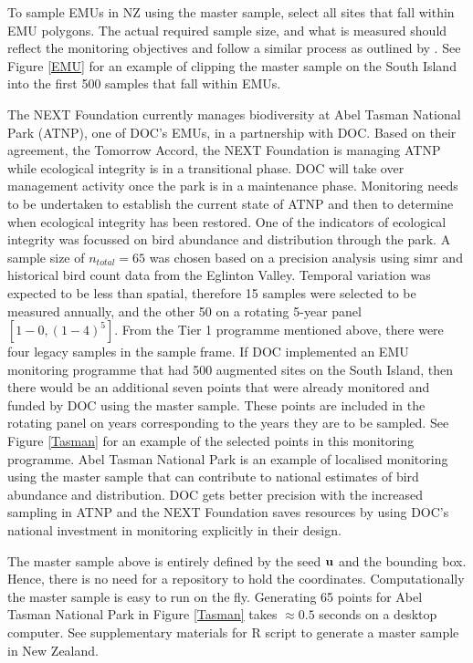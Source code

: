 \documentclass[titlepage]{article}
\begin{document}
To sample EMUs in NZ using the master sample, select all sites that fall within EMU polygons. The actual required sample size, and what is measured should reflect the monitoring objectives and follow a similar process as outlined by \citep{Reynolds2016}. See Figure \ref{EMU} for an example of clipping the master sample on the South Island into the first 500 samples that fall within EMUs.
 
The NEXT Foundation currently manages biodiversity at Abel Tasman National Park (ATNP), one of DOC's EMUs, in a partnership with DOC. Based on their agreement, the Tomorrow Accord, the NEXT Foundation is managing ATNP while ecological integrity is in a transitional phase. DOC will take over management activity once the park is in a maintenance phase. Monitoring needs to be undertaken to establish the current state of ATNP and then to determine when ecological integrity has been restored. One of the indicators of ecological integrity was focussed on bird abundance and distribution through the park. A sample size of $n_{total} = 65$ was chosen based on a precision analysis using simr \citep{simr} and historical bird count data from the Eglinton Valley. Temporal variation was expected to be less than spatial, therefore 15 samples were selected to be measured annually, and the other 50 on a rotating 5-year panel $[1-0,(1-4)^5]$. From the Tier 1 programme mentioned above, there were four legacy samples in the sample frame. If DOC implemented an EMU monitoring programme that had 500 augmented sites on the South Island, then there would be an additional seven points that were already monitored and funded by DOC using the master sample. These points are included in the rotating panel on years corresponding to the years they are to be sampled. See Figure \ref{Tasman} for an example of the selected points in this monitoring programme. Abel Tasman National Park is an example of localised monitoring using the master sample that can contribute to national estimates of bird abundance and distribution. DOC gets better precision with the increased sampling in ATNP and the NEXT Foundation saves resources by using DOC's national investment in monitoring explicitly in their design.

The master sample above is entirely defined by the seed ${\bf u}$ and the bounding box. Hence, there is no need for a repository to hold the coordinates. Computationally the master sample is easy to run on the fly. Generating 65 points for Abel Tasman National Park in Figure \ref{Tasman} takes $\approx 0.5$ seconds on a desktop computer. See supplementary materials for R script to generate a master sample in New Zealand.
\end{document}

